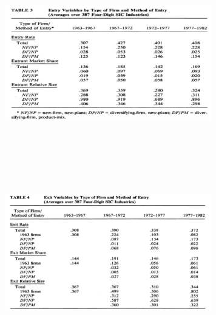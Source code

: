 \documentclass[dvipdfmx,12pt]{beamer}
\begin{document}
\begin{frame}

\begin{center}

\includegraphics[width=9cm,height=7.75cm]{DRS_T3.pdf}

\end{center}

\end{frame}

\begin{frame}

\begin{center}

\includegraphics[width=9cm,height=7.75cm]{DRS_T4.pdf}

\end{center}

\end{frame}
\end{document}
